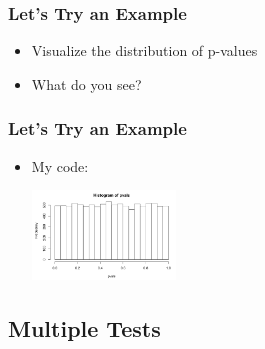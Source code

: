 \documentclass[14pt,handout]{beamer}
\begin{document}
\begin{frame}
\frametitle{Let's Try an Example}
\begin{itemize}
	\item<+-> Visualize the distribution of p-values
	\item<+-> What do you see?
\end{itemize}
\end{frame}

\begin{frame}
\frametitle{Let's Try an Example}
\begin{itemize}
	\item[] My code:
	\ttfamily
	\footnotesize
{}
\begin{center}
	\includegraphics[width=0.3\textwidth]{images_20171128_R_pvals.png}
\end{center}
\end{itemize}
\end{frame}

\subsection{Multiple Tests}
\end{document}

